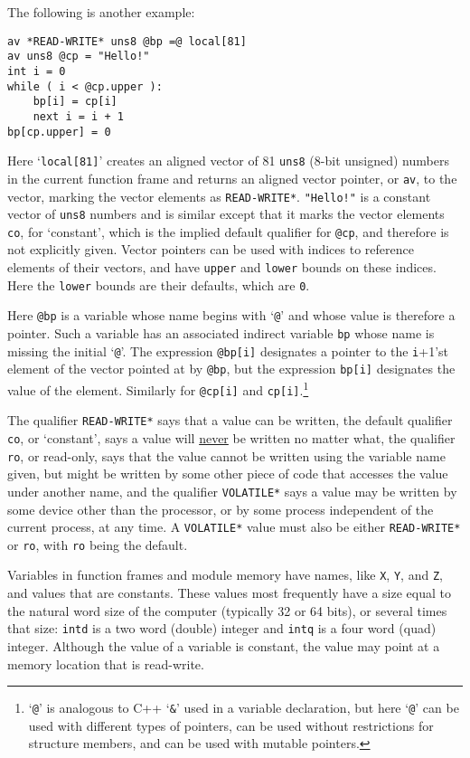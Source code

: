 \documentclass[12pt]{article}
\newenvironment{indpar}[1][0.3in]%
	{\begin{list}{}%
		     {\setlength{\itemsep}{0in}%
		      \setlength{\topsep}{0in}%
		      \setlength{\parsep}{1ex}%
		      \setlength{\labelwidth}{#1}%
		      \setlength{\leftmargin}{#1}%
		      \addtolength{\leftmargin}{\labelsep}}%
	 \item}%
	{\end{list}}
\begin{document}
The following is another example:
\begin{indpar}\begin{verbatim}
av *READ-WRITE* uns8 @bp =@ local[81]
av uns8 @cp = "Hello!"
int i = 0
while ( i < @cp.upper ):
    bp[i] = cp[i]
    next i = i + 1
bp[cp.upper] = 0
\end{verbatim}\end{indpar}

Here `{\tt local[81]}' creates an aligned vector of
81 {\tt uns8} (8-bit unsigned) numbers in the current function
frame and returns an aligned vector pointer, or {\tt av}, to
the vector, marking the vector elements as {\tt *READ-WRITE*}.
{\tt "Hello!"} is a constant vector of {\tt uns8} numbers
and is similar except that it marks the vector elements
{\tt co}, for `constant', which is the implied default qualifier
for {\tt @cp}, and therefore
is not explicitly given.
Vector pointers can be used with indices
to reference elements of their vectors, and have {\tt upper} and
{\tt lower} bounds on these indices.  Here the {\tt lower} bounds
are their defaults, which are {\tt 0}.

Here {\tt @bp} is a variable whose name begins with `{\tt @}' and
whose value is therefore a pointer.  Such a variable has an associated
indirect variable {\tt bp} whose name is missing the initial `{\tt @}'.
The expression {\tt @bp[i]} designates a pointer to the {\tt i}+1'st
element of the vector pointed at by {\tt @bp}, but the expression
{\tt bp[i]} designates the value of the element.  Similarly for
{\tt @cp[i]} and {\tt cp[i]}.\footnote{`{\tt @}' is analogous to
C++ `{\tt \&}' used in a variable declaration, but here `{\tt @}'
can be used with different types of pointers, can be used
without restrictions for structure members, and can be used
with mutable pointers.}

The qualifier {\tt *READ-WRITE*} says that a value can be written,
the default qualifier {\tt co}, or `constant',
says a value will \underline{never} be written no matter what,
the qualifier {\tt ro}, or read-only, says that
the value cannot be written using the variable name given, but might be
written by some other piece of code that accesses the value under another
name, and the qualifier {\tt *VOLATILE*} says a value may be
written by some device other than the processor, or by some process
independent of the current process, at any time.
A {\tt *VOLATILE*} value must also be either {\tt *READ-WRITE*}
or {\tt ro}, with {\tt ro} being the default.

Variables in function frames and module memory
have names, like {\tt X}, {\tt Y}, and {\tt Z}, and values
that are constants.
These values most frequently
have a size equal to the natural
word size of the computer (typically 32 or 64 bits), or
several times that size: {\tt intd} is a two word (double) integer
and {\tt intq} is a four word (quad) integer.
Although the value of a variable is constant, the value may point
at a memory location that is read-write.
\end{document}
